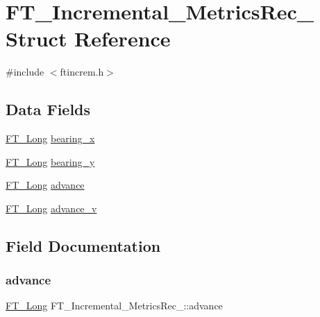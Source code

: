 \hypertarget{struct_f_t___incremental___metrics_rec__}{}\section{F\+T\+\_\+\+Incremental\+\_\+\+Metrics\+Rec\+\_\+ Struct Reference}
\label{struct_f_t___incremental___metrics_rec__}


{\ttfamily \#include $<$ftincrem.\+h$>$}

\subsection*{Data Fields}
\begin{DoxyCompactItemize}
\item 
\hyperlink{fttypes_8h_a7fa72a1f0e79fb1860c5965789024d6f}{F\+T\+\_\+\+Long} \hyperlink{struct_f_t___incremental___metrics_rec___af065d998d0a0f2a57513125038d802a6}{bearing\+\_\+x}
\item 
\hyperlink{fttypes_8h_a7fa72a1f0e79fb1860c5965789024d6f}{F\+T\+\_\+\+Long} \hyperlink{struct_f_t___incremental___metrics_rec___af1443aa7c1ca54d3c2a29f1cf6d7848b}{bearing\+\_\+y}
\item 
\hyperlink{fttypes_8h_a7fa72a1f0e79fb1860c5965789024d6f}{F\+T\+\_\+\+Long} \hyperlink{struct_f_t___incremental___metrics_rec___a996c99aa0e6b36c2c7776fc1a2b6b614}{advance}
\item 
\hyperlink{fttypes_8h_a7fa72a1f0e79fb1860c5965789024d6f}{F\+T\+\_\+\+Long} \hyperlink{struct_f_t___incremental___metrics_rec___a0ee280662a03ea935dbfe377e56f4d6d}{advance\+\_\+v}
\end{DoxyCompactItemize}


\subsection{Field Documentation}
\mbox{\label{struct_f_t___incremental___metrics_rec___a996c99aa0e6b36c2c7776fc1a2b6b614}} 
\subsubsection{\texorpdfstring{advance}{advance}}
{\footnotesize\ttfamily \hyperlink{fttypes_8h_a7fa72a1f0e79fb1860c5965789024d6f}{F\+T\+\_\+\+Long} F\+T\+\_\+\+Incremental\+\_\+\+Metrics\+Rec\+\_\+\+::advance}

